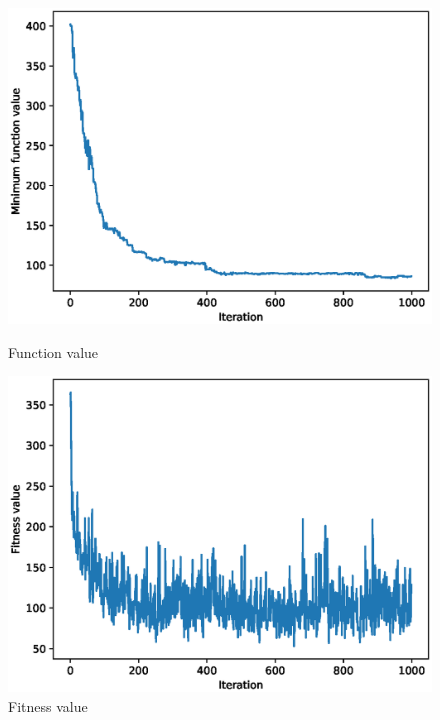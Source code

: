 \documentclass{article}
\begin{document}
\begin{figure}[!htbp]
	\centering
	\begin{minipage}{.48\textwidth}
		\centering
		\includegraphics[scale=.4]{experiment_1b_rastrigin/min_eval_0.eps}
		\caption{Function value}
	\end{minipage}\hfill
	\begin{minipage}{.48\textwidth}
		\centering
		\includegraphics[scale=.4]{experiment_1b_rastrigin/max_fitness_0.eps}
		\caption{Fitness value}
	\end{minipage}
\end{figure}
\FloatBarrier
\end{document}
